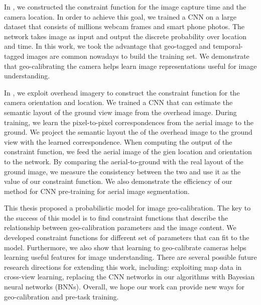 In , we constructed the constraint function for 
the image capture time and the camera location. In order to achieve
this goal, we trained a CNN on a large dataset that consists of
millions webcam frames and smart phone photos. The network takes image
as input and output the discrete probability over location and time.
In this work, we took the advantage that geo-tagged and
temporal-tagged images are common nowadays to build the training set.
We demonstrate that geo-calibrating the camera helps learn image
representations useful for image understanding.

In , we exploit overhead imagery to construct
the constraint function for the camera orientation and location.
We trained a CNN that can estimate the semantic layout of the ground
view image from the overhead image. During training, we learn the
pixel-to-pixel correspondences from the aerial image to the ground. We
project the semantic layout the of the overhead image to the ground
view with the learned correspondence.
When computing the output of the constraint function, we feed the
aerial image of the gien location and orientation to the network. By
comparing the aerial-to-ground with the real layout of the ground
image, we measure the consistency between the two and use
it as the value of our constraint function.
We also demonstrate the efficiency of our method for CNN pre-training
for aerial image segmentation.

This thesis proposed a probabilistic model for image
geo-calibration.
The key to the success of this model is to find constraint
functions that describe the relationship between geo-calibration
parameters and the image content. We developed constraint
functions for different set of parameters that can fit to the model.
Furthermore, we also show that learning to geo-calibrate cameras helps learning
useful features for image understanding.
There are several possible future research directions for extending
this work, including: exploiting map data in cross-view learning,
replacing the CNN networks in our algorithms with Bayesian neural
networks (BNNs).
Overall, we hope our work can provide new ways for geo-calibration and
pre-task training.
